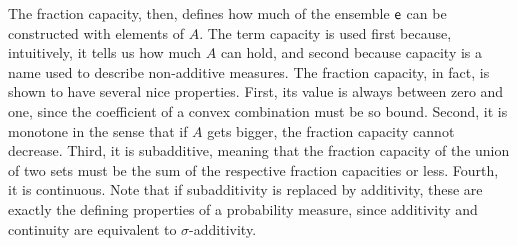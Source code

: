 The fraction capacity, then, defines how much of the ensemble $\mathsf{e}$ can be constructed with elements of $A$. The term capacity is used first because, intuitively, it tells us how much $A$ can hold, and second because capacity is a name used to describe non-additive measures. The fraction capacity, in fact, is shown to have several nice properties. First, its value is always between zero and one, since the coefficient of a convex combination must be so bound. Second, it is monotone in the sense that if $A$ gets bigger, the fraction capacity cannot decrease. Third, it is subadditive, meaning that the fraction capacity of the union of two sets must be the sum of the respective fraction capacities or less. Fourth, it is continuous. Note that if subadditivity is replaced by additivity, these are exactly the defining properties of a probability measure, since additivity and continuity are equivalent to $\sigma$-additivity.

